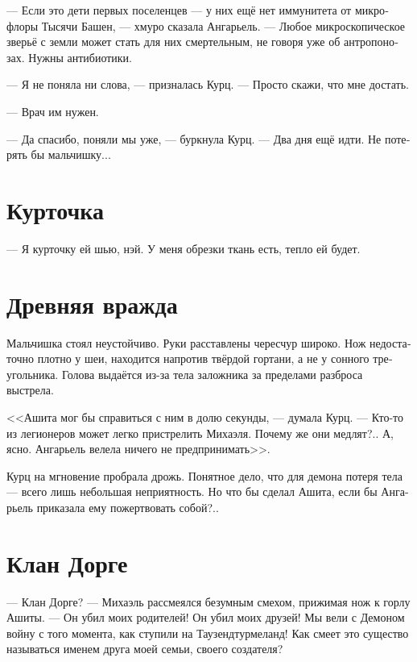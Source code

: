 \documentclass[a4paper,12pt,fleqn]{book}\usepackage{polyglossia}\setdefaultlanguage[babelshorthands=true]{russian}\setotherlanguage{english}\defaultfontfeatures{Ligatures=TeX,Mapping=tex-text}\usepackage{xcolor}\newcommand{\ml}[3]{#2}
\begin{document}
--- Если это дети первых поселенцев --- у них ещё нет иммунитета от микрофлоры Тысячи Башен, --- хмуро сказала Ангарьель.
--- Любое микроскопическое зверьё с земли может стать для них смертельным, не говоря уже об антропонозах.
Нужны антибиотики.

--- Я не поняла ни слова, --- призналась Курц.
--- Просто скажи, что мне достать.

--- Врач им нужен.

--- Да спасибо, поняли мы уже, --- буркнула Курц.
--- Два дня ещё идти.
Не потерять бы мальчишку...

\section{Курточка}

--- Я курточку ей шью, нэй.
У меня обрезки ткань есть, тепло ей будет.

\section{Древняя вражда}

Мальчишка стоял неустойчиво.
Руки расставлены чересчур широко.
Нож недостаточно плотно у шеи, находится напротив твёрдой гортани, а не у сонного треугольника.
Голова выдаётся из-за тела заложника за пределами разброса выстрела.

\ml{$0$}
{<<Ашита мог бы справиться с ним в долю секунды, --- думала Курц.}
{\textit{Ashita could handle him in a split second,} Kurz thought.}
\ml{$0$}
{--- Кто-то из легионеров может легко пристрелить Михаэля.}
{\textit{One of the legionaires could easily shoot Michael.}}
\ml{$0$}
{Почему же они медлят?..}
{\textit{Why do they hesitate ...?}}
\ml{$0$}
{А, ясно.}
{\textit{Ah, I see.}}
\ml{$0$}
{Ангарьель велела ничего не предпринимать>>.}
{\textit{Angariel told no moves.}}

Курц на мгновение пробрала дрожь.
Понятное дело, что для демона потеря тела --- всего лишь небольшая неприятность.
Но что бы сделал Ашита, если бы Ангарьель приказала ему пожертвовать собой?..

\section{Клан Дорге}

--- Клан Дорге? --- Михаэль рассмеялся безумным смехом, прижимая нож к горлу Ашиты.
\ml{$0$}
{--- Он убил моих родителей!}
{``It killed my parents!}
\ml{$0$}
{Он убил моих друзей!}
{It killed my friends!}
\ml{$0$}
{Мы вели с Демоном войну с того момента, как ступили на Таузендтурмеланд!}
{We were fighting the Demon since we landed Tausendt\"{u}rmeland!}
\ml{$0$}
{Как смеет это существо называться именем друга моей семьи, своего создателя?}
{How dare that thing to call itself the name of my family's friend, the name of its creator!''}
\end{document}
